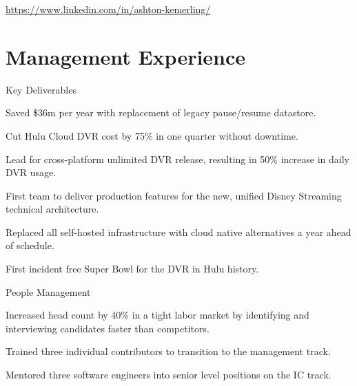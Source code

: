 \documentclass[]{deedy-resume-openfont}
\begin{document}
%
%


%
%



\href{https://www.linkedin.com/in/ashton-kemerling/}{https://www.linkedin.com/in/ashton-kemerling/}

\begin{center}
\end{center}

\section{Management Experience}

\vspace{\topsep}
Key Deliverables
\begin{tightemize}
\item Saved \$36m per year with replacement of legacy pause/resume datastore.
\item Cut Hulu Cloud DVR cost by 75\% in one quarter without downtime.
\item Lead for cross-platform unlimited DVR release, resulting in 50\% increase in daily DVR usage.
\item First team to deliver production features for the new, unified Disney Streaming technical architecture.
\item Replaced all self-hosted infrastructure with cloud native alternatives a year ahead of schedule.
\item First incident free Super Bowl for the DVR in Hulu history.
\end{tightemize}

\sectionsep
People Management
\begin{tightemize}
\item Increased head count by 40\% in a tight labor market by identifying and interviewing candidates faster than competitors.
\item Trained three individual contributors to transition to the management track.
\item Mentored three software engineers into senior level positions on the IC track.
\end{tightemize}
\sectionsep
\end{document}
